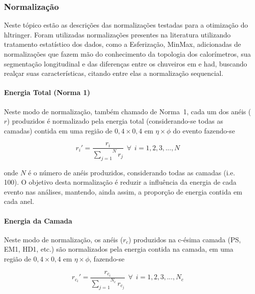 \subsubsection{Normalização}
\label{sssec:preproc_norm}

Neste tópico estão as descrições das normalizações testadas para a otimização do
\gls{hltringer}. Foram utilizadas normalizações presentes na literatura
utilizando tratamento estatístico dos dados, como a Esferização, MinMax, 
adicionadas de normalizações que fazem mão do conhecimento da topologia dos calorímetros, 
sua segmentação longitudinal e das diferenças entre os chuveiros \gls{em} e \gls{had}, 
buscando realçar suas características, citando entre elas a normalização
sequencial.

\paragraph{Energia Total (Norma 1)}
\label{par:norm_norm1}

Neste modo de normalização, também chamado de Norma~1, cada um dos anéis ($r$) produzidos é normalizado pela energia total 
(considerando-se todas as camadas) contida em uma região de $0,4 \times 0,4$ em 
$\eta \times \phi$ do evento fazendo-se

\begin{equation}
r_{i}' = \frac{r_i}{\overset{N}{\underset{j=1}{\sum}} r_j}~~\forall~~i=1,2,3,...,N
\end{equation}

\noindent onde $N$ é o número de anéis produzidos, considerando todas as camadas (i.e. 100). 
O objetivo desta normalização é reduzir a influência da energia de cada evento nas análises, 
mantendo, ainda assim, a proporção de energia contida em cada anel.


\paragraph{Energia da Camada}
\label{par:norm_camada}

Neste modo de normalização, os anéis ($r_c$) produzidos na c-ésima camada (PS, EM1, HD1, etc.) 
são normalizados pela energia contida na camada, em uma região de $0,4 \times 0,4$ em $\eta 
\times \phi$, fazendo-se

\begin{equation}
r_{c_{i}}' = \frac{r_{c_{i}}}{\overset{N_c}{\underset{j=1}{\sum}} r_{c_j}}~~\forall~~i=1,2,3,...,N_c
\end{equation}

